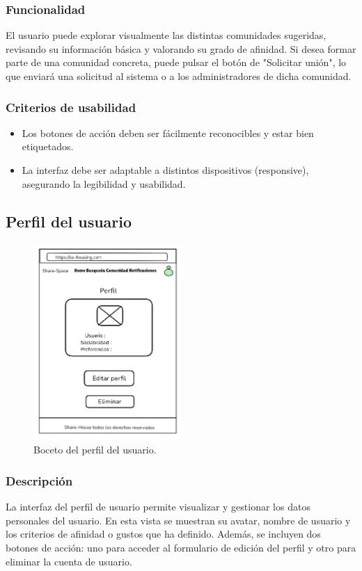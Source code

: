 \subsubsection{Funcionalidad}
El usuario puede explorar visualmente las distintas comunidades sugeridas, revisando su información básica y valorando su grado de afinidad. Si desea formar parte de una comunidad concreta, puede pulsar el botón de "Solicitar unión", lo que enviará una solicitud al sistema o a los administradores de dicha comunidad.

\subsubsection{Criterios de usabilidad}
\begin{itemize}
  \item Los botones de acción deben ser fácilmente reconocibles y estar bien etiquetados.
  \item La interfaz debe ser adaptable a distintos dispositivos (responsive), asegurando la legibilidad y usabilidad.
\end{itemize}


\subsection{Perfil del usuario}
\begin{figure}[H]
    \centering
    \includegraphics[width=0.5\textwidth]{fotos/perfil-usuario-boceto.png}
    \caption{Boceto del perfil del usuario.}
    \label{fig:perfil-user}
\end{figure}
\subsubsection{Descripción}
La interfaz del perfil de usuario permite visualizar y gestionar los datos personales del usuario. En esta vista se muestran su avatar, nombre de usuario y los criterios de afinidad o gustos que ha definido. Además, se incluyen dos botones de acción: uno para acceder al formulario de edición del perfil y otro para eliminar la cuenta de usuario.

